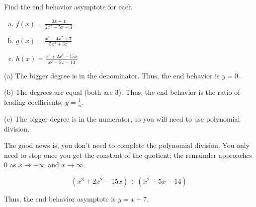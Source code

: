 \vspace{12pt}

\begin{example}
Find the end behavior asymptote for each.

\begin{multicols}{3}
\begin{enumerate}[(a)]
    \item $f(x) = \frac{3x+1}{2x^2-5x-3}$
    \item $g(x) = \frac{x^3 - 4x^2 + 7}{5x^3 + 3x}$
    \item $h(x) = \frac{x^3+2x^2-15x}{x^2-5x-14}$
\end{enumerate}
\end{multicols}
\end{example}

\begin{solution}

(a) The bigger degree is in the denominator. Thus, the end behavior is $y = 0$. \newline 

(b) The degrees are equal (both are 3). Thus, the end behavior is the ratio of leading coefficients: $y = \frac{1}{5}$. \newline 

(c) The bigger degree is in the numerator, so you will need to use polynomial division. \newline 

The good news is, you don't need to complete the polynomial division. You only need to stop once you get the constant of the quotient; the remainder approaches 0 as $x \to -\infty$ and $x \to \infty$.

\[
\left(x^3 + 2x^2 - 15x\right) \div \left(x^2 - 5x - 14\right)
\]

\begin{center}
\end{center}

Thus, the end behavior asymptote is $y = x + 7$. \newline 
\end{solution}

